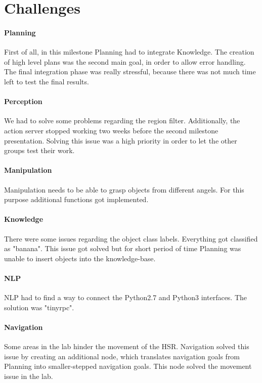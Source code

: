 \documentclass[main.tex]{subfiles}
\begin{document}
	
	\chapter{Challenges}

	\subsubsection{Planning}
	First of all, in this milestone Planning had to integrate Knowledge. The creation of high level plans was the second main goal,
	in order to allow error handling.
	The final integration phase was really stressful, because there was not much time left to test the final results.

	\subsubsection{Perception}
	We had to solve some problems regarding the region filter.
	Additionally, the action server stopped working two weeks before the second milestone presentation.
	Solving this issue was a high priority in order to let the other groups test their work.	

	\subsubsection{Manipulation}
	Manipulation needs to be able to grasp objects from different angels.
	For this purpose additional functions got implemented.
	
	\subsubsection{Knowledge}
	There were some issues regarding the object class labels. Everything got classified as "banana".
	This issue got solved but for short period of time Planning was unable to insert objects into
	the knowledge-base.

	\subsubsection{NLP}
	NLP had to find a way to connect the Python2.7 and Python3 interfaces.
	The solution was "tinyrpc".

	\subsubsection{Navigation}
	Some areas in the lab hinder the movement of the HSR. Navigation solved this issue by creating
	an additional node, which translates navigation goals from Planning into smaller-stepped navigation goals.
	This node solved the movement issue in the lab.
		
\end{document}
